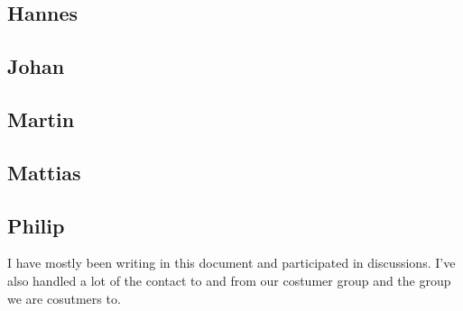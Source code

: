 \documentclass[a4paper]{article}
\begin{document}
  \subsection{Hannes}
  \subsection{Johan}
  \subsection{Martin}
  \subsection{Mattias}
  \subsection{Philip}
  I have mostly been writing in this document and participated in discussions. 
  I've also handled a lot of the contact to and from our costumer group and the group we are cosutmers to.
\end{document}
